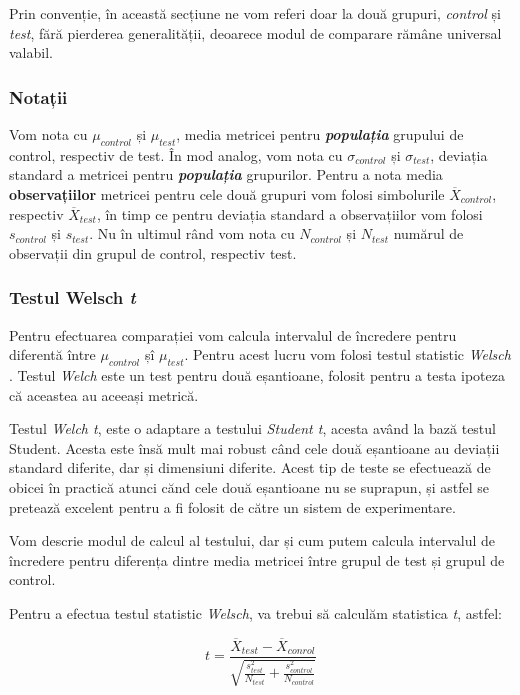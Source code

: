 Prin convenție, în această secțiune ne vom referi doar la două grupuri, \textit{control} și \textit{test}, fără pierderea generalității, deoarece modul de comparare rămâne universal valabil.

\subsubsection{Notații}

Vom nota cu  $\mu_{control}$ și $\mu_{test}$, media metricei pentru \textit{\textbf{populația}} grupului de control, respectiv de test. În mod analog, vom nota cu $\sigma_{control}$ și $\sigma_{test}$, deviația standard a metricei pentru \textit{\textbf{populația}} grupurilor. Pentru a nota media \textbf{observațiilor} metricei pentru cele două grupuri vom folosi simbolurile $\overline{X}_{control}$, respectiv $\overline{X}_{test}$, în timp ce pentru deviația standard a observațiilor vom folosi $s_{control}$ și $s_{test}$. Nu în ultimul rând vom nota cu $N_{control}$ și $N_{test}$ numărul de observații din grupul de control, respectiv test.

\subsubsection{Testul Welsch \textit{t}}

Pentru efectuarea comparației vom calcula intervalul de încredere pentru diferentă între $\mu_{control}$ șî $\mu_{test}$. Pentru acest lucru vom folosi testul statistic \textit{Welsch} \cite{Welch1947}. Testul \textit{Welch} este un test pentru două eșantioane, folosit pentru a testa ipoteza că aceastea au aceeași metrică. 

Testul \textit{Welch t}, este o adaptare a testului \textit{Student t}, acesta având la bază testul Student. Acesta este însă mult mai robust când cele două eșantioane au deviații standard diferite, dar și dimensiuni diferite. Acest tip de teste se efectuează de obicei în practică atunci cănd cele două eșantioane nu se suprapun, și astfel se pretează excelent pentru a fi folosit de către un sistem de experimentare. 

Vom descrie modul de calcul al testului, dar și cum putem calcula intervalul de încredere pentru diferența dintre media metricei între grupul de test și grupul de control.

Pentru a efectua testul statistic \textit{Welsch}, va trebui să calculăm statistica \textit{t}\cite{Welch1947}, astfel:

\begin{equation}
\label{tstatistic}
	t = \frac{\overline{X}_{test} - \overline{X}_{conrol}}{
		\sqrt{ {\frac{s_{test}^2}{N_{test}} }+ {\frac{s_{control}^2}{N_{control}}}}
		}
\end{equation}


